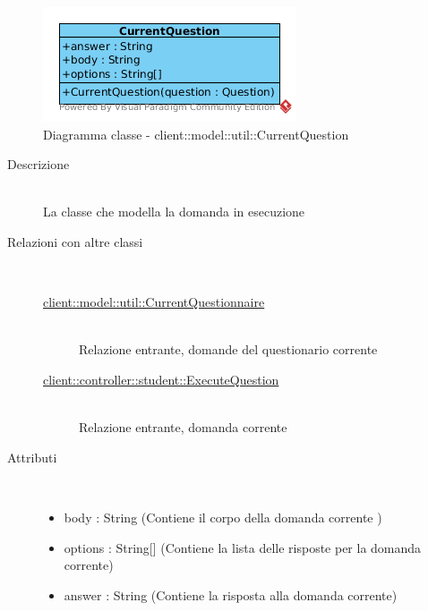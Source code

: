 \vspace{0.5cm}
\hypertarget{client::model::util::CurrentQuestion}{}
\begin{center}
			\begin{figure}[H]
				\centering \includegraphics[scale=4, max width=\textwidth, max height=\myheight]{../img/diagrammiClassi/client/model/util/CurrentQuestion.png}
				\caption{Diagramma classe - client::model::util::CurrentQuestion}
			\end{figure}
		\end{center}\begin{description}
\item[Descrizione] \hfill \\
 La classe che modella la domanda in esecuzione
\item[Relazioni con altre classi] \hfill \\
 \vspace{-7mm}
\begin{description}
\item[\hyperlink{client::model::util::CurrentQuestionnaire}{client::model::util::CurrentQuestionnaire}] \hfill \\
 Relazione entrante, domande del questionario corrente
\item[\hyperlink{client::controller::student::ExecuteQuestion}{client::controller::student::ExecuteQuestion}] \hfill \\
 Relazione entrante, domanda corrente
\end{description}

\item[Attributi] \hfill \\
 \vspace{-7mm}
\begin{itemize}
\item body : String (Contiene il corpo della domanda corrente )
\item options : String[] (Contiene la lista delle risposte per la domanda corrente)
\item answer : String (Contiene la risposta alla domanda corrente)
\end{itemize}


\end{description}
